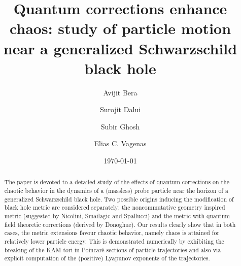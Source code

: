 \documentclass[aps,prd,showpacs,nofootinbib,floats,floatfix,preprintnumbers,groupedaddress,twocolumn]{revtex4-1}
\begin{document}
\title{Quantum corrections enhance chaos: study of particle motion near a generalized Schwarzschild black hole}
\author{Avijit Bera}
\author{Surojit Dalui}
\author{Subir Ghosh}
\author{Elias C. Vagenas}


\date{\today}

\begin{abstract}
\par\noindent
The paper is devoted to a detailed study  of the effects of quantum corrections on the chaotic behavior in the dynamics of a (massless) probe particle near the horizon of a generalized Schwarzschild black hole. Two possible origins inducing the modification  of black hole metric are considered separately; the noncommutative geometry inspired metric (suggested by   Nicolini,  Smailagic and  Spallucci) and the metric with  quantum field theoretic corrections (derived by Donoghue). Our results clearly show that in both cases, the metric extensions favour chaotic behavior, namely chaos is attained for relatively lower particle energy. This is demonstrated numerically by exhibiting the breaking of the KAM tori in Poincar\'e sections of particle trajectories and also via explicit computation of the (positive) Lyapunov exponents of the trajectories.
\end{abstract}

\maketitle


%
%
%
%
\end{document}
